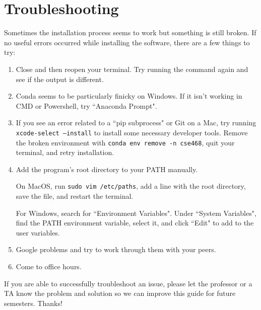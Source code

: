 \documentclass[12pt]{article}
\begin{document}
\section{Troubleshooting}
Sometimes the installation process seems to work but something is still broken. If no useful errors occurred while installing the software, there are a few things to try:
\begin{enumerate}
\item Close and then reopen your terminal. Try running the command again and see if the output is different.
\item Conda seems to be particularly finicky on Windows. If it isn't working in CMD or Powershell, try  ``Anaconda Prompt".
\item If you see an error related to a ``pip subprocess" or Git on a Mac, try running \texttt{xcode-select --install} to install some necessary developer tools. Remove the broken environment with \texttt{conda env remove -n cse468}, quit your terminal, and retry installation.

\item Add the program's root directory to your PATH manually.

On MacOS, run \texttt{sudo vim /etc/paths}, add a line with the root directory, save the file, and restart the terminal.

For Windows, search for ``Environment Variables". Under ``System Variables", find the PATH environment variable, select it, and click ``Edit" to add to the user variables. 

\item Google problems and try to work through them with your peers.
\item Come to office hours.

\end{enumerate}

If you are able to successfully troubleshoot an issue, please let the professor or a TA know the problem and solution so we can improve this guide for future semesters. Thanks!
\end{document}
